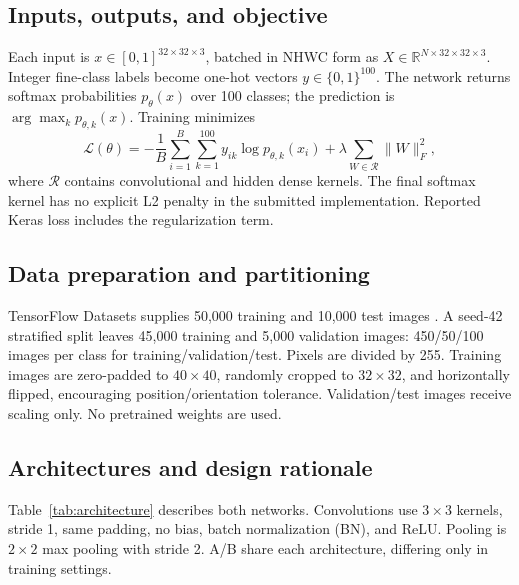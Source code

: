 \documentclass[conference]{IEEEtran}
\begin{document}
\subsection{Inputs, outputs, and objective}
Each input is $x\in[0,1]^{32\times32\times3}$, batched in NHWC form as $X\in\mathbb{R}^{N\times32\times32\times3}$. Integer fine-class labels become one-hot vectors $y\in\{0,1\}^{100}$. The network returns softmax probabilities $p_\theta(x)$ over 100 classes; the prediction is $\arg\max_k p_{\theta,k}(x)$. Training minimizes
\begin{equation}
\mathcal{L}(\theta)=-\frac{1}{B}\sum_{i=1}^{B}\sum_{k=1}^{100}y_{ik}\log p_{\theta,k}(x_i)
+\lambda\sum_{W\in\mathcal{R}}\|W\|_F^2,
\end{equation}
where $\mathcal{R}$ contains convolutional and hidden dense kernels. The final softmax kernel has no explicit L2 penalty in the submitted implementation. Reported Keras loss includes the regularization term.

\subsection{Data preparation and partitioning}
TensorFlow Datasets supplies 50,000 training and 10,000 test images \cite{cifar}. A seed-42 stratified split leaves 45,000 training and 5,000 validation images: 450/50/100 images per class for training/validation/test. Pixels are divided by 255. Training images are zero-padded to $40\times40$, randomly cropped to $32\times32$, and horizontally flipped, encouraging position/orientation tolerance. Validation/test images receive scaling only. No pretrained weights are used.

\subsection{Architectures and design rationale}
Table~\ref{tab:architecture} describes both networks. Convolutions use $3\times3$ kernels, stride 1, same padding, no bias, batch normalization (BN), and ReLU. Pooling is $2\times2$ max pooling with stride 2. A/B share each architecture, differing only in training settings.
\end{document}
